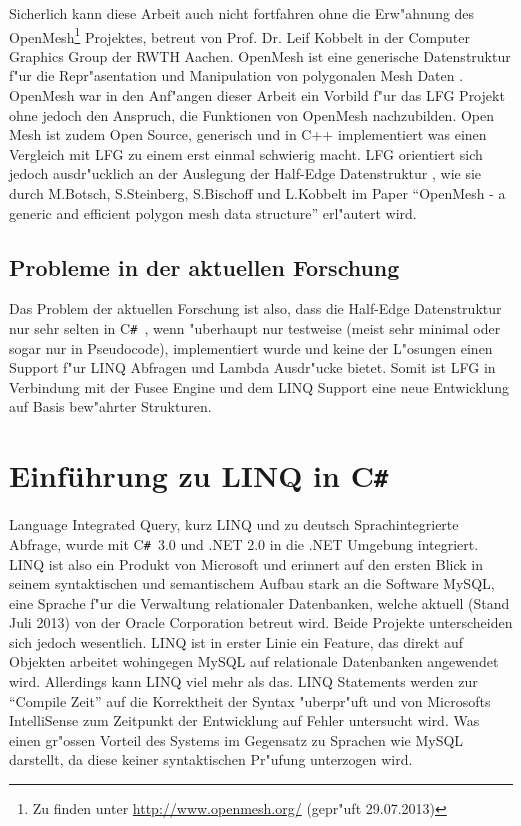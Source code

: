 \documentclass[pagesize, paper=a4, fontsize=12pt,titlepage=true, headings=small, headnosepline, abstractoff, liststotoc, nochapterprefix, plainheadsepline]{scrreprt}
\newcommand{\CS}{C\texttt{\#}}
\newcommand{\CSS}{C\texttt{\# }}
\newcommand{\HES}{Half-Edge Datenstruktur }
\begin{document}
Sicherlich kann diese Arbeit auch nicht fortfahren ohne die Erw"ahnung des OpenMesh\footnote{Zu finden unter \url{http://www.openmesh.org/} (gepr"uft 29.07.2013)} Projektes, betreut von Prof. Dr. Leif Kobbelt in der Computer Graphics Group der RWTH Aachen. OpenMesh ist eine generische Datenstruktur f"ur die Repr"asentation und Manipulation von polygonalen Mesh Daten \cite{Kobbelt.2013}. OpenMesh war in den Anf"angen dieser Arbeit ein Vorbild f"ur das LFG Projekt ohne jedoch den Anspruch, die Funktionen von OpenMesh nachzubilden. Open Mesh ist zudem Open Source, generisch und in C++ implementiert was einen Vergleich mit LFG zu einem erst einmal schwierig macht. LFG orientiert sich jedoch ausdr"ucklich an der Auslegung der \HES, wie sie durch M.Botsch, S.Steinberg, S.Bischoff und L.Kobbelt im Paper "`OpenMesh - a generic and efficient polygon mesh data structure"' \cite{Botsch.2002} erl"autert wird.
		\subsection {Probleme in der aktuellen Forschung}
			Das Problem der aktuellen Forschung ist also, dass die \HES nur sehr selten in \CSS, wenn "uberhaupt nur testweise (meist sehr minimal oder sogar nur in Pseudocode), implementiert wurde und keine der L"osungen einen Support f"ur LINQ Abfragen und Lambda Ausdr"ucke bietet. Somit ist LFG in Verbindung mit der Fusee Engine und dem LINQ Support eine neue Entwicklung auf Basis bew"ahrter Strukturen.
	\section {Einführung zu LINQ in \CS}
		Language Integrated Query, kurz LINQ und zu deutsch Sprachintegrierte Abfrage, wurde mit \CSS 3.0 und .NET 2.0 in die .NET Umgebung integriert. LINQ ist also ein Produkt von Microsoft und erinnert auf den ersten Blick in seinem syntaktischen und semantischem Aufbau stark an die Software MySQL, eine Sprache f"ur die Verwaltung relationaler Datenbanken, welche aktuell (Stand Juli 2013) von der Oracle Corporation betreut wird. Beide Projekte unterscheiden sich jedoch wesentlich. LINQ ist in erster Linie ein Feature, das direkt auf Objekten arbeitet wohingegen MySQL auf relationale Datenbanken angewendet wird. Allerdings kann LINQ viel mehr als das. LINQ Statements werden zur "`Compile Zeit"' auf die Korrektheit der Syntax "uberpr"uft und von Microsofts IntelliSense zum Zeitpunkt der Entwicklung auf Fehler untersucht wird. Was einen gr"ossen Vorteil des Systems im Gegensatz zu Sprachen wie MySQL darstellt, da diese keiner syntaktischen Pr"ufung unterzogen wird.
\newline
\end{document}
